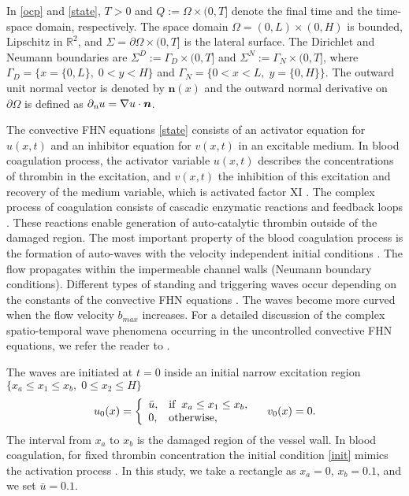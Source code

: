 \documentclass[preprint,12pt]{elsarticle}
\begin{document}
In \eqref{ocp} and \eqref{state}, $T>0$ and $Q:= \Omega \times (0,T]$ denote the final time and the time-space domain, respectively.  The space domain $\Omega=(0,L) \times (0,H)$ is bounded, Lipschitz  in $\mathbb{R}^2$, and $\Sigma=\partial\Omega \times (0,T]$ is the lateral surface. The  Dirichlet and Neumann boundaries are $\Sigma^D := \Gamma_D \times (0,T]$ and $\Sigma^N := \Gamma_N \times (0,T]$, where $\Gamma_D=\{x=\{0,L\},\; 0 < y < H \}$ and  $\Gamma_N =\{0 < x < L,\; y =\{0,H\} \}$. The outward unit normal vector is  denoted by $\bm{n}(x)$ and the outward normal derivative on $\partial \Omega$ is defined as
 $\partial_{\emph{n}}u=\nabla u\cdot \bm{n}$.


The convective FHN equations \eqref{state} consists of an activator equation for $u(x,t)$ and an inhibitor equation for $v(x,t)$ in an excitable medium. In blood coagulation process, the activator variable $u(x,t)$  describes the concentrations of thrombin in the excitation, and $v(x,t)$ the inhibition
of this excitation and recovery of the medium variable, which is activated factor XI \cite{Ermakova05}. The complex process of coagulation consists of cascadic  enzymatic reactions and feedback loops \cite{Lonabov05}. These reactions enable generation of auto-catalytic thrombin outside of the
damaged region.  The most important property of the blood coagulation process is the formation of auto-waves with the velocity independent
initial conditions  \cite{Ermakova09opo,Ermakova05,Lonabov05}.
The flow propagates  within the impermeable channel walls (Neumann boundary conditions).  Different types of standing and triggering waves occur depending on the constants of the convective FHN equations \cite{Ermakova09opo}. The waves become more curved when the flow velocity $b_{max}$ increases. For a detailed discussion of the complex spatio-temporal wave phenomena occurring in the uncontrolled convective FHN equations, we refer the reader to \cite{Ermakova09opo,Ataullakhanov}.


The waves are initiated at $t=0$ inside an initial
narrow excitation region $\{ x_a \le x_1 \le x_b, \; 0 \le x_2 \le H\}$
\begin{equation} \label{init}
u_0(x) = \left\{
             \begin{array}{ll}
               \bar{u}, & \hbox{if} \;\; x_a \leq x_1 \leq x_b,  \\
               0, & \hbox{otherwise},
             \end{array}
           \right.
 \quad
v_0(x) = 0.
\end{equation}
The interval from $x_a$ to $x_b$ is the damaged region
of the vessel wall. In  blood coagulation, for fixed thrombin concentration
the initial condition \eqref{init}   mimics the activation process \cite{Ermakova09opo,Ermakova05,Lonabov05}. In this study, we take a rectangle as $x_a=0$, $x_b=0.1$, and we set $\bar{u}=0.1$.
\end{document}
